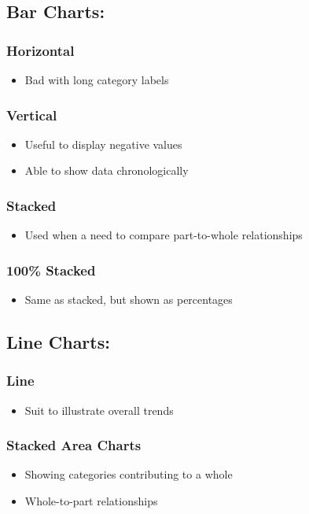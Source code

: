 \documentclass[a5paper]{article}
\begin{document}
	\subsection{Bar Charts:}
	\subsubsection{Horizontal}
	\begin{itemize}
		\item Bad with long category labels
	\end{itemize}
	\subsubsection{Vertical}
	\begin{itemize}
		\item Useful to display negative values
		\item Able to show data chronologically
	\end{itemize}
	\subsubsection{Stacked}
	\begin{itemize}
		\item Used when a need to compare part-to-whole relationships
	\end{itemize}
	\subsubsection{100\% Stacked}
	\begin{itemize}
		\item Same as stacked, but shown as percentages
	\end{itemize}
	\subsection{Line Charts:}
	\subsubsection{Line}
	\begin{itemize}
		\item Suit to illustrate overall trends
	\end{itemize}
	\subsubsection{Stacked Area Charts}
	\begin{itemize}
		\item Showing categories contributing to a whole
		\item Whole-to-part relationships
	\end{itemize}
\end{document}
